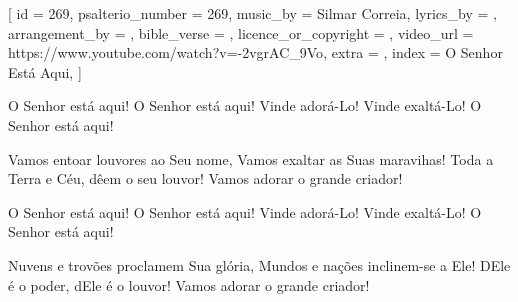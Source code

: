 
[
    id                     = {269},
    psalterio_number       = {269},
    music_by               = {Silmar Correia},
    lyrics_by              = {},
    arrangement_by         = {},
    bible_verse            = {},
    licence_or_copyright   = {},
    video_url              = {https://www.youtube.com/watch?v=-2vgrAC_9Vo},
    extra                  = {},
    index                  = {O Senhor Está Aqui},
]


\beginchorus

O Senhor está aqui!
O Senhor está aqui!
Vinde adorá-Lo!
Vinde exaltá-Lo!
O Senhor está aqui!

\endchorus


\beginverse

Vamos entoar louvores ao Seu nome, 
Vamos exaltar as Suas maravihas!
Toda a Terra e Céu, dêem o seu louvor!
Vamos adorar o grande criador!

\endverse


\beginchorus

O Senhor está aqui!
O Senhor está aqui!
Vinde adorá-Lo!
Vinde exaltá-Lo!
O Senhor está aqui!

\endchorus


\beginverse

Nuvens e trovões proclamem Sua glória,
Mundos e nações inclinem-se a Ele!
DEle é o poder, dEle é o louvor!
Vamos adorar o grande criador!

\endverse

\endsong
